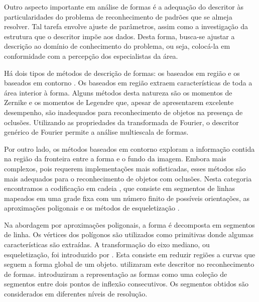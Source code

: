 Outro aspecto importante em análise de formas é a adequação do descritor às particularidades do problema de reconhecimento de padrões que se almeja resolver. Tal tarefa envolve ajuste de parâmetros, assim como a investigação da estrutura que o descritor impõe aos dados. Desta forma, busca-se ajustar a descrição ao domínio de conhecimento do problema, ou seja, colocá-la em conformidade com a percepção dos especialistas da área. 

Há dois tipos de métodos de descrição de formas: os baseados em região e os baseados em contorno \cite{Zhang:2004}. Os baseados em região extraem características de toda a área interior à forma. Alguns métodos desta natureza são os momentos de Zernike \cite{Kim:2000} e os momentos de Legendre \cite{Yang:2006} que, apesar de apresentarem excelente desempenho, são inadequados para reconhecimento de objetos na presença de oclusões. Utilizando as propriedades da transformada de Fourier, o descritor genérico de Fourier \cite{Zhang:2002} permite a análise multiescala de formas.

Por outro lado, os métodos baseados em contorno exploram a informação contida na região da fronteira entre a forma e o fundo da imagem. Embora mais complexos, pois requerem implementações mais sofisticadas, esses métodos são mais adequados para o reconhecimento de objetos com oclusões. Nesta categoria encontramos a codificação em cadeia \cite[p~337]{Costa:2009}, que consiste em segmentos de linhas mapeados em uma grade fixa com um número finito de possíveis orientações, as aproximações poligonais \cite[p~340--351]{Costa:2009} e os métodos de esqueletização \cite[p~394--400]{Costa:2009}. 

Na abordagem por aproximações poligonais, a forma é decomposta em segmentos de linha. Os vértices dos polígonos são utilizados como primitivas donde algumas características são extraídas. A transformação do eixo mediano, ou esqueletização, foi introduzido por . Esta consiste em reduzir regiões a curvas que seguem a forma global de um objeto.  utilizaram este descritor no reconhecimento de formas.  introduziram a representação as formas como uma coleção de segmentos entre dois pontos de inflexão consecutivos. Os segmentos obtidos são considerados em diferentes níveis de resolução. 


